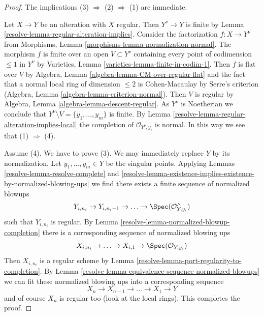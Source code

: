 \begin{proof}

The implications (3) $\Rightarrow$ (2) $\Rightarrow$ (1) are immediate.

\medskip\noindent
Let $X \to Y$ be an alteration with $X$ regular. Then $Y^\nu \to Y$
is finite by Lemma \ref{resolve-lemma-regular-alteration-implies}.
Consider the factorization $f : X \to Y^\nu$ from
Morphisms, Lemma \ref{morphisms-lemma-normalization-normal}.
The morphism $f$ is finite over an open $V \subset Y^\nu$ containing
every point of codimension $\leq 1$ in $Y^\nu$
by Varieties, Lemma \ref{varieties-lemma-finite-in-codim-1}.
Then $f$ is flat over $V$ by
Algebra, Lemma \ref{algebra-lemma-CM-over-regular-flat}
and the fact that a normal local ring
of dimension $\leq 2$ is Cohen-Macaulay by Serre's criterion
(Algebra, Lemma \ref{algebra-lemma-criterion-normal}).
Then $V$ is regular by Algebra, Lemma \ref{algebra-lemma-descent-regular}.
As $Y^\nu$ is Noetherian we conclude that
$Y^\nu \setminus V = \{y_1, \ldots, y_m\}$ is finite.
By Lemma \ref{resolve-lemma-regular-alteration-implies-local}
the completion of $\mathcal{O}_{Y^\nu, y_i}$ is normal.
In this way we see that (1) $\Rightarrow$ (4).

\medskip\noindent
Assume (4). We have to prove (3). We may immediately replace
$Y$ by its normalization. Let $y_1, \ldots, y_m \in Y$ be the
singular points. Applying
Lemmas \ref{resolve-lemma-resolve-complete} and
\ref{resolve-lemma-existence-implies-existence-by-normalized-blowing-ups}
we find  there exists a finite sequence of normalized blowups
$$
Y_{i, n_i} \to Y_{i, n_i - 1} \to \ldots \to \Spec(\mathcal{O}^\wedge_{Y, y_i})
$$
such that $Y_{i, n_i}$ is regular. By
Lemma \ref{resolve-lemma-normalized-blowup-completion}
there is a corresponding sequence of normalized blowing ups
$$
X_{i, n_i} \to \ldots \to X_{i, 1} \to \Spec(\mathcal{O}_{Y, y_i})
$$
Then $X_{i, n_i}$ is a regular scheme by
Lemma \ref{resolve-lemma-port-regularity-to-completion}.
By Lemma \ref{resolve-lemma-equivalence-sequence-normalized-blowups}
we can fit these normalized blowing ups
into a corresponding sequence
$$
X_n \to X_{n - 1} \to \ldots \to X_1 \to Y
$$
and of course $X_n$ is regular too (look at the local rings).
This completes the proof.
\end{proof}

